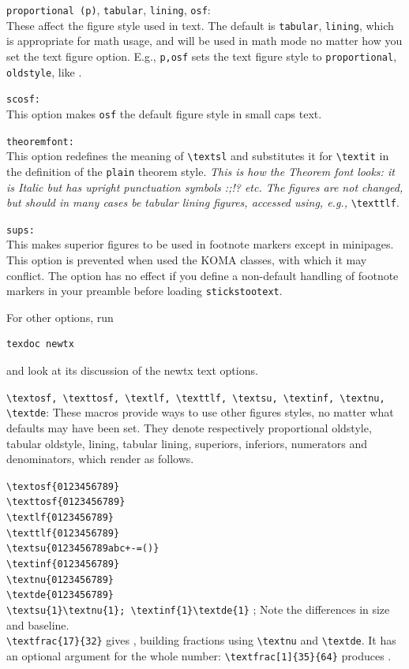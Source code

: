 \documentclass[11pt]{article}
\begin{document}
{\tt proportional (p)}, {\tt tabular}, {\tt lining}, {\tt osf}:\\
These affect the figure style used in text. The default is {\tt tabular}, {\tt lining}, which is appropriate for math usage, and will be used in math mode no matter how you set the text figure option. E.g., {\tt p,osf} sets the text figure style to {\tt proportional}, {\tt oldstyle}, like . 

{\tt scosf:}\\
This option makes {\tt osf} the default figure style in small caps text. 

{\tt theoremfont:}\\
This option redefines the meaning of \verb|\textsl| and substitutes it for \verb|\textit| in the definition of the {\tt plain} theorem style. \textsl{This is how the Theorem font looks: it is Italic but has upright punctuation symbols :;!? etc. The figures are not changed, but should in many cases be tabular lining figures, accessed using, e.g.,\/} \verb|\texttlf|.

{\tt sups:}\\
This makes superior figures to be used in footnote markers except in minipages. This option is prevented when used the KOMA classes, with which it may conflict. The option has no effect if you define a non-default handling of footnote markers in your preamble before loading {\tt stickstootext}.

For other options, run
\begin{verbatim}
texdoc newtx
\end{verbatim}
and look at its discussion of the newtx text options.

\verb|\textosf, \texttosf, \textlf, \texttlf, \textsu, \textinf, \textnu, \textde|:
These macros provide ways to use other figures styles, no matter what defaults may have been set. They denote respectively proportional oldstyle, tabular oldstyle, lining, tabular lining, superiors, inferiors, numerators and denominators, which render as follows.

\verb|\textosf{0123456789}| \\
\verb|\texttosf{0123456789}| \\
\verb|\textlf{0123456789}| \\
\verb|\texttlf{0123456789}| \\
\verb|\textsu{0123456789abc+-=()}| \\
\verb|\textinf{0123456789}| \\
\verb|\textnu{0123456789}| \\
\verb|\textde{0123456789}| \\
\verb|\textsu{1}\textnu{1}; \textinf{1}\textde{1}| ;  Note the differences in size and baseline.\\
\verb|\textfrac{17}{32}| gives , building fractions using \verb|\textnu| and \verb|\textde|. It has an optional argument for the whole number: \verb|\textfrac[1]{35}{64}| produces .
\end{document}
